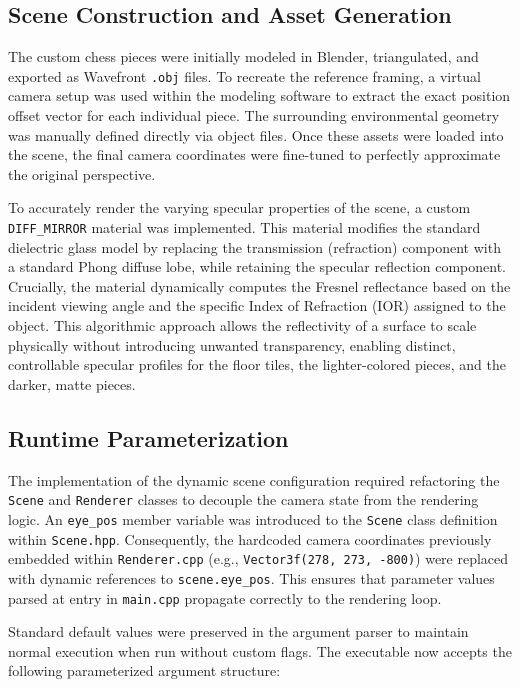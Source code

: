 \documentclass[11pt, a4paper]{article}
\begin{document}
\subsection*{Scene Construction and Asset Generation}
The custom chess pieces were initially modeled in Blender, triangulated, and exported as Wavefront \texttt{.obj} files. To recreate the reference framing, a virtual camera setup was used within the modeling software to extract the exact position offset vector for each individual piece. The surrounding environmental geometry was manually defined directly via object files. Once these assets were loaded into the scene, the final camera coordinates were fine-tuned to perfectly approximate the original perspective.

To accurately render the varying specular properties of the scene, a custom \texttt{DIFF\_MIRROR} material was implemented. This material modifies the standard dielectric glass model by replacing the transmission (refraction) component with a standard Phong diffuse lobe, while retaining the specular reflection component. Crucially, the material dynamically computes the Fresnel reflectance based on the incident viewing angle and the specific Index of Refraction (IOR) assigned to the object. This algorithmic approach allows the reflectivity of a surface to scale physically without introducing unwanted transparency, enabling distinct, controllable specular profiles for the floor tiles, the lighter-colored pieces, and the darker, matte pieces.
\subsection*{Runtime Parameterization}
The implementation of the dynamic scene configuration required refactoring the \texttt{Scene} and \texttt{Renderer} classes to decouple the camera state from the rendering logic. An \texttt{eye\_pos} member variable was introduced to the \texttt{Scene} class definition within \texttt{Scene.hpp}. Consequently, the hardcoded camera coordinates previously embedded within \texttt{Renderer.cpp} (e.g., \texttt{Vector3f(278, 273, -800)}) were replaced with dynamic references to \texttt{scene.eye\_pos}. This ensures that parameter values parsed at entry in \texttt{main.cpp} propagate correctly to the rendering loop. 

Standard default values were preserved in the argument parser to maintain normal execution when run without custom flags. The executable now accepts the following parameterized argument structure:
\end{document}
